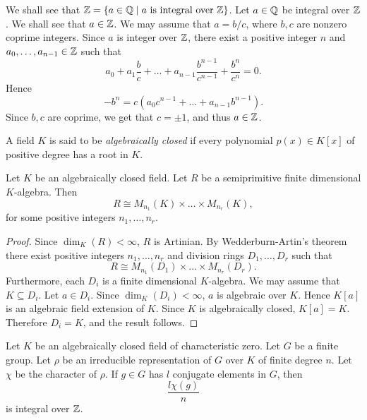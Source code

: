 \begin{example}\label{Zintclosed}
We shall see that $\mathbb{Z}=\{ a\in \mathbb{Q}\mid a \mbox{ is integral over }\mathbb{Z}\}$. Let $a\in \mathbb{Q}$ be integral over $\mathbb{Z}$. We shall see that $a\in\mathbb{Z}$.
We may assume that $a=b/c$, where $b,c$ are nonzero coprime integers. Since $a$ is integer over $\mathbb{Z}$, there exist a positive integer $n$ and $a_0,\dots ,a_{n-1}\in \mathbb{Z}$ such that
\[ a_0+a_1\frac{b}{c}+\dots +a_{n-1}\frac{b^{n-1}}{c^{n-1}}+\frac{b^{n}}{c^{n}}=0.\]
Hence
\[-b^n=c(a_0c^{n-1}+\dots +a_{n-1}b^{n-1}).\]
Since $b,c$ are coprime, we get that $c=\pm 1$, and thus $a\in \mathbb{Z}$.
\end{example}

A field $K$ is said to be {\em algebraically closed} if every polynomial $p(x)\in K[x]$ of positive degree has a root in $K$.

\begin{proposition}\label{algclosedfield}
Let $K$ be an algebraically closed field. Let $R$ be a semiprimitive finite dimensional $K$-algebra.
Then
\[ R\cong M_{n_1}(K)\times\dots\times M_{n_r}(K),\]
for some positive integers $n_1,\dots ,n_r$.
\end{proposition}

\begin{proof}
    Since $\dim_K(R)<\infty$, $R$ is Artinian. By Wedderburn-Artin's theorem there exist positive integers $n_1,\dots ,n_r$
    and division rings $D_1,\dots ,D_r$ such that
    \[ R\cong M_{n_1}(D_1)\times\dots\times M_{n_r}(D_r).\]
    Furthermore, each $D_i$ is a finite dimensional $K$-algebra. We may assume that $K\subseteq D_i$. Let $a\in D_i$. Since
    $\dim_K(D_i)<\infty$, $a$ is algebraic over $K$. Hence $K[a]$ is an algebraic field extension of $K$. Since $K$ is algebraically closed, $K[a]=K$. Therefore $D_i=K$, and the result follows.
\end{proof}

\begin{proposition}\label{integraloverZ}
Let $K$ be an algebraically closed field of characteristic zero. Let $G$ be a finite group. Let $\rho$ be an 
irreducible representation of $G$ over $K$ of finite degree $n$. Let $\chi$ be the character of $\rho$. If $g\in G$ has $l$ conjugate elements
in $G$, then 
\[\frac{l\chi(g)}{n}\]
is integral over $\mathbb{Z}$.
\end{proposition}

